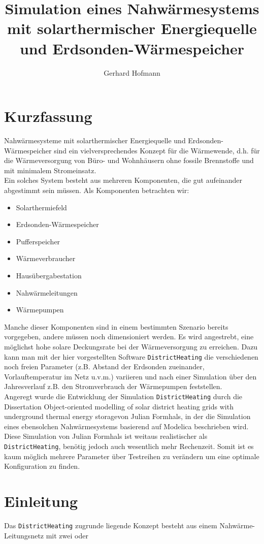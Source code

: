 \documentclass[12pt,a4paper]{article}
\author{Gerhard Hofmann}
\title{Simulation eines Nahwärmesystems mit solarthermischer Energiequelle und Erdsonden-Wärmespeicher}
\begin{document}
\maketitle
\tableofcontents
\section{Kurzfassung}
Nahwärmesysteme mit solarthermischer Energiequelle und Erdsonden-Wärmespeicher sind ein vielversprechendes Konzept für die Wärmewende, d.h. für die Wärmeversorgung von Büro- und Wohnhäusern ohne fossile Brennstoffe und mit minimalem Stromeinsatz.\\
Ein solches System besteht aus mehreren Komponenten, die gut aufeinander abgestimmt sein müssen. Als Komponenten betrachten wir:\begin{itemize}
\item Solarthermiefeld
\item Erdsonden-Wärmespeicher
\item Pufferspeicher
\item Wärmeverbraucher
\item Hausübergabestation
\item Nahwärmeleitungen
\item Wärmepumpen
\end{itemize}
Manche dieser Komponenten sind in einem bestimmten Szenario bereits vorgegeben, andere müssen noch dimensioniert werden. 
Es wird angestrebt, eine möglichst hohe solare Deckungsrate bei der Wärmeversorgung zu erreichen. Dazu kann man mit der hier vorgestellten Software \texttt{DistrictHeating} die verschiedenen noch freien Parameter (z.B. Abstand der Erdsonden zueinander, Vorlauftemperatur im Netz u.v.m.) variieren und nach einer Simulation über den Jahresverlauf z.B. den Stromverbrauch der Wärmepumpen feststellen.\\
Angeregt wurde die Entwicklung der Simulation \texttt{DistrictHeating} durch die Dissertation \glqq Object-oriented modelling of solar district heating grids with underground thermal energy storage\grqq von Julian Formhals, in der die Simulation eines ebensolchen Nahwärmesystems basierend auf  Modelica beschrieben wird. Diese Simulation von Julian Formhals ist weitaus realistischer als \texttt{DistrictHeating}, benötig jedoch auch wesentlich mehr Rechenzeit. Somit ist es kaum möglich mehrere Parameter über Testreihen zu verändern um eine optimale Konfiguration zu finden.
\section{Einleitung}
Das \texttt{DistrictHeating} zugrunde liegende Konzept besteht aus einem Nahwärme-Leitungsnetz mit zwei oder 
\end{document}
